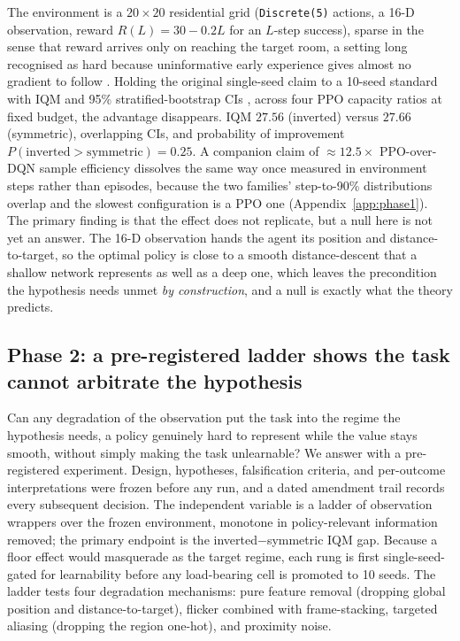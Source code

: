 \documentclass{article}
\begin{document}
The environment is a $20\times20$ residential grid (\texttt{Discrete(5)} actions, a 16-D
observation, reward $R(L)=30-0.2L$ for an $L$-step success), sparse in the sense that reward
arrives only on reaching the target room, a setting long recognised as hard because
uninformative early experience gives almost no gradient to follow
\citep{andrychowicz2017her}. Holding the original single-seed claim to a 10-seed standard
with IQM and 95\% stratified-bootstrap CIs \citep{agarwal2021precipice}, across four PPO
\citep{schulman2017ppo} capacity ratios at fixed budget, the advantage disappears. IQM
$27.56$ (inverted) versus $27.66$ (symmetric), overlapping CIs, and probability of
improvement $P(\text{inverted}>\text{symmetric})=0.25$. A companion claim of
${\approx}12.5\times$ PPO-over-DQN sample efficiency dissolves the same way once measured in
environment steps rather than episodes, because the two families' step-to-90\% distributions
overlap and the slowest configuration is a PPO one (Appendix~\ref{app:phase1}). The primary
finding is that the effect does not replicate, but a null here is not yet an answer. The 16-D
observation hands the agent its position and distance-to-target, so the optimal policy is
close to a smooth distance-descent that a shallow network represents as well as a deep one,
which leaves the precondition the hypothesis needs unmet \emph{by construction}, and a null is
exactly what the theory predicts.

\subsection{Phase 2: a pre-registered ladder shows the task cannot arbitrate the hypothesis}
\label{sec:phase2}

Can any degradation of the observation put the task into the regime the hypothesis needs, a
policy genuinely hard to represent while the value stays smooth, without simply making the
task unlearnable? We answer with a pre-registered experiment. Design, hypotheses,
falsification criteria, and per-outcome interpretations were frozen before any run, and a
dated amendment trail records every subsequent decision. The independent variable is a ladder
of observation wrappers over the frozen environment, monotone in policy-relevant information
removed; the primary endpoint is the inverted$-$symmetric IQM gap. Because a floor effect
would masquerade as the target regime, each rung is first single-seed-gated for learnability
before any load-bearing cell is promoted to 10 seeds. The ladder tests four degradation
mechanisms: pure feature removal (dropping global position and distance-to-target),
flicker combined with frame-stacking, targeted aliasing (dropping the region one-hot), and
proximity noise.
\end{document}

